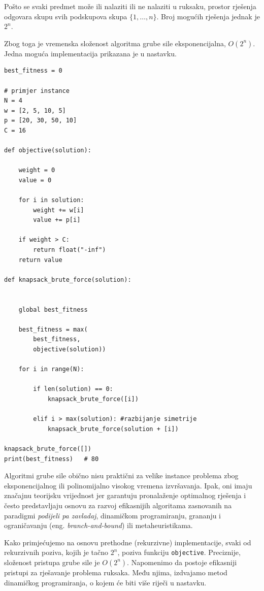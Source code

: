 Pošto se svaki predmet može ili nalaziti ili ne nalaziti u ruksaku, prostor rješenja odgovara skupu svih podskupova skupa $\{1,\ldots,n\}$. Broj mogućih rješenja jednak je $2^n.$

Zbog toga je vremenska složenost algoritma grube sile eksponencijalna, $O(2^n).$  Jedna moguća implementacija prikazana je u nastavku.

\begin{verbatim}
best_fitness = 0

# primjer instance
N = 4
w = [2, 5, 10, 5]
p = [20, 30, 50, 10]
C = 16

def objective(solution):

    weight = 0
    value = 0

    for i in solution:
        weight += w[i]
        value += p[i]

    if weight > C:
        return float("-inf")
    return value

def knapsack_brute_force(solution):


    global best_fitness

    best_fitness = max(
        best_fitness,
        objective(solution))

    for i in range(N):

        if len(solution) == 0:
            knapsack_brute_force([i])

        elif i > max(solution): #razbijanje simetrije
            knapsack_brute_force(solution + [i])

knapsack_brute_force([])
print(best_fitness)   # 80
\end{verbatim}

Algoritmi grube sile obično nisu praktični za velike instance problema zbog eksponencijalnog ili polinomijalno visokog vremena izvršavanja. Ipak, oni imaju značajnu teorijsku vrijednost jer garantuju pronalaženje optimalnog rješenja i često predstavljaju osnovu za razvoj efikasnijih algoritama zasnovanih na paradigmi \emph{podijeli pa zavladaj}, dinamičkom programiranju, grananju i ograničavanju (eng. \emph{branch-and-bound}) ili metaheuristikama.


Kako primjećujemo na osnovu prethodne (rekurzivne) implementacije, svaki od  
rekurzivnih poziva, kojih je tačno $2^n$, poziva funkciju \texttt{objective}. Preciznije, složenost pristupa grube sile je $O(2^n)$. Napomenimo da postoje efikasniji pristupi za rješavanje problema ruksaka. Među njima, izdvajamo metod dinamičkog programiranja, o kojem će biti više riječi u nastavku.



